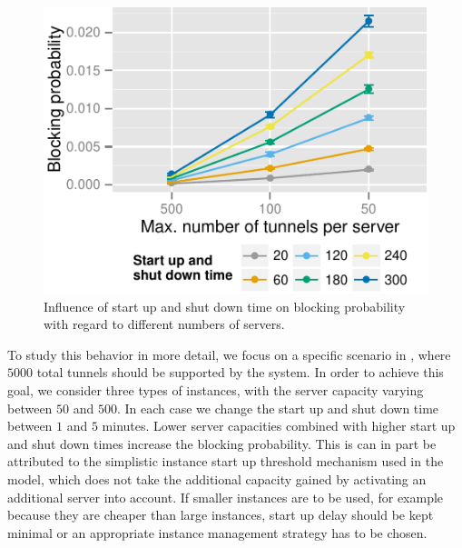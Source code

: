 \begin{figure}[htbp]
  \begin{center}
  \includegraphics[width=1.0\columnwidth]{figures/compare-maxinstances-block.pdf}
  \caption{Influence of start up and shut down time on blocking probability with regard to different numbers of servers.}
  \label{fig:compare_maxinstances_block}
  \end{center}
\end{figure}
To study this behavior in more detail, we focus on a specific scenario in , where $5000$ total tunnels should be supported by the system.
In order to achieve this goal, we consider three types of instances, with the server capacity varying between $50$ and $500$. In each case we change the start up and shut down time between $1$ and $5$ minutes.
Lower server capacities combined with higher start up and shut down times increase the blocking probability. This is can in part be attributed to the simplistic instance start up threshold mechanism used in the model, which does not take the additional capacity gained by activating an additional server into account. 
If smaller instances are to be used, for example because they are cheaper than large instances, start up delay should be kept minimal or an appropriate instance management strategy has to be chosen.

